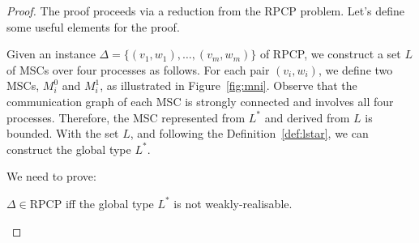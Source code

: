 \begin{proof}
	The proof proceeds via a reduction from the RPCP problem. Let's define some useful
	elements for the proof.

	Given an instance $\Delta = \{(v_1, w_1), \ldots, (v_m, w_m)\}$ of RPCP, we
	construct a set $L$ of MSCs over four processes as follows. For each pair
	$(v_i, w_i)$, we define two MSCs, $M^0_i$ and $M^1_i$, as illustrated in
	Figure~\ref{fig:mni}.
	Observe that the communication graph of each MSC is strongly connected and
	involves all four processes. Therefore, the MSC represented from
	$L^*$ and derived from $L$ is bounded.
	With the set $L$, and following the Definition~\ref{def:lstar},
	we can construct the global type $L^*$.

	We need to prove:
	\begin{center}
		$\Delta \in \text{RPCP}$ iff the global type $L^*$ is not weakly-realisable.
	\end{center}


\end{proof}
